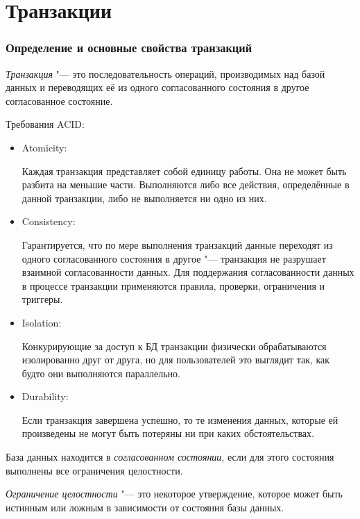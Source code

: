 \part{Транзакции}

\section{Определение и основные свойства транзакций}

\begin{definition}
	\emph{Транзакция} "--- это последовательность операций, производимых над базой данных и переводящих её из одного согласованного состояния в другое согласованное состояние.
\end{definition}

Требования ACID:
\begin{itemize}
	\item Atomicity:

		Каждая транзакция представляет собой единицу работы.
		Она не может быть разбита на меньшие части.
		Выполняются либо все действия, определённые в данной транзакции, либо не выполняется ни одно из них.
	\item Consistency:

		Гарантируется, что по мере выполнения транзакций данные переходят из одного согласованного состояния в другое "--- транзакция не разрушает взаимной согласованности данных.
		Для поддержания согласованности данных в процессе транзакции применяются правила, проверки, ограничения и триггеры.
	\item Isolation:

		Конкурирующие за доступ к БД транзакции физически обрабатываются изолированно друг от друга, но для пользователей это выглядит так, как будто они выполняются параллельно.
	\item Durability:

		Если транзакция завершена успешно, то те изменения данных, которые ей произведены не могут быть потеряны ни при каких обстоятельствах.
\end{itemize}

\begin{definition}
	База данных находится в \emph{согласованном состоянии}, если для этого состояния выполнены все ограничения целостности.
\end{definition}

\begin{definition}
	\emph{Ограничение целостности} "--- это некоторое утверждение, которое может быть истинным или ложным в зависимости от состояния базы данных.
\end{definition}

